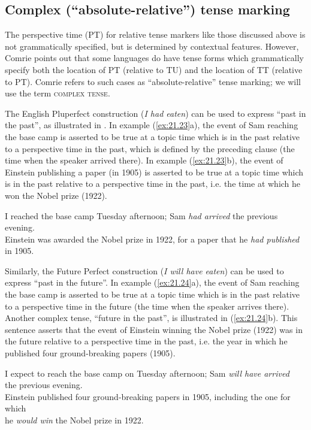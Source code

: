 \subsection{Complex (“absolute-relative”) tense marking}\label{sec:21.4.1}

The perspective time (PT) for relative tense markers like those discussed above is not grammatically specified, but is determined by contextual features. However, Comrie points out that some languages do have tense forms which grammatically specify both the location of PT (relative to TU) and the location of TT (relative to PT). Comrie refers to such cases as “absolute-relative” tense marking; we will use the term \textsc{complex tense}.



The English Pluperfect construction (\textit{I had eaten}) can be used to express “past in the past”, as illustrated in . In example (\ref{ex:21.23}a), the event of Sam reaching the base camp is asserted to be true at a topic time which is in the past relative to a perspective time in the past, which is defined by the preceding clause (the time when the speaker arrived there). In example (\ref{ex:21.23}b), the event of Einstein publishing a paper (in 1905) is asserted to be true at a topic time which is in the past relative to a perspective time in the past, i.e. the time at which he won the Nobel prize (1922).


\ea \label{ex:21.23}
\ea  I reached the base camp Tuesday afternoon; Sam \textit{had arrived} the previous evening.\\
\ex Einstein was awarded the Nobel prize in 1922, for a paper that he \textit{had published}\\
  in 1905.
                       \z
\z


Similarly, the Future Perfect construction (\textit{I will have eaten}) can be used to express “past in the future”. In example (\ref{ex:21.24}a), the event of Sam reaching the base camp is asserted to be true at a topic time which is in the past relative to a perspective time in the future (the time when the speaker arrives there). Another complex tense, “future in the past”, is illustrated in (\ref{ex:21.24}b). This sentence asserts that the event of Einstein winning the Nobel prize (1922) was in the future relative to a perspective time in the past, i.e. the year in which he published four ground-breaking papers (1905).


\ea \label{ex:21.24}
\ea  I expect to reach the base camp on Tuesday afternoon; Sam \textit{will have arrived} \\
  the previous evening.\\
\ex Einstein published four ground-breaking papers in 1905, including the one for which\\
  he \textit{would win} the Nobel prize in 1922.
                       \z
\z


